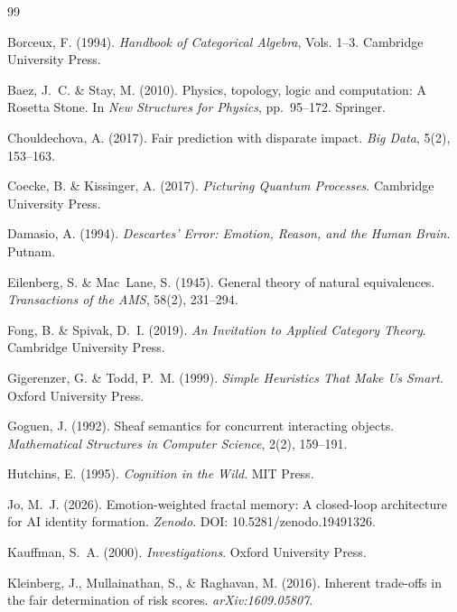 \documentclass[11pt,a4paper]{article}
\begin{document}
\begin{thebibliography}{99}

Borceux, F. (1994).
\newblock \emph{Handbook of Categorical Algebra}, Vols. 1--3.
\newblock Cambridge University Press.

Baez, J.~C. \& Stay, M. (2010).
\newblock Physics, topology, logic and computation: A Rosetta Stone.
\newblock In \emph{New Structures for Physics}, pp.~95--172. Springer.

Chouldechova, A. (2017).
\newblock Fair prediction with disparate impact.
\newblock \emph{Big Data}, 5(2), 153--163.

Coecke, B. \& Kissinger, A. (2017).
\newblock \emph{Picturing Quantum Processes}.
\newblock Cambridge University Press.

Damasio, A. (1994).
\newblock \emph{Descartes' Error: Emotion, Reason, and the Human Brain}.
\newblock Putnam.

Eilenberg, S. \& Mac~Lane, S. (1945).
\newblock General theory of natural equivalences.
\newblock \emph{Transactions of the AMS}, 58(2), 231--294.

Fong, B. \& Spivak, D.~I. (2019).
\newblock \emph{An Invitation to Applied Category Theory}.
\newblock Cambridge University Press.

Gigerenzer, G. \& Todd, P.~M. (1999).
\newblock \emph{Simple Heuristics That Make Us Smart}.
\newblock Oxford University Press.

Goguen, J. (1992).
\newblock Sheaf semantics for concurrent interacting objects.
\newblock \emph{Mathematical Structures in Computer Science}, 2(2), 159--191.

Hutchins, E. (1995).
\newblock \emph{Cognition in the Wild}.
\newblock MIT Press.

Jo, M.~J. (2026).
\newblock Emotion-weighted fractal memory: A closed-loop architecture for AI identity formation.
\newblock \emph{Zenodo}. DOI: 10.5281/zenodo.19491326.

Kauffman, S.~A. (2000).
\newblock \emph{Investigations}.
\newblock Oxford University Press.

Kleinberg, J., Mullainathan, S., \& Raghavan, M. (2016).
\newblock Inherent trade-offs in the fair determination of risk scores.
\newblock \emph{arXiv:1609.05807}.


\end{thebibliography}
\end{document}
